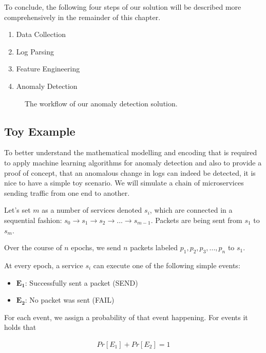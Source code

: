 To conclude, the following four steps of our solution will be described more comprehensively in the remainder of this chapter.

\begin{enumerate}
    \item Data Collection 
    \item Log Parsing
    \item Feature Engineering
    \item Anomaly Detection
\end{enumerate}

\begin{figure}[h]
    \centering
    
    \caption{The workflow of our anomaly detection solution.}
    \label{fig:worklowOverview}
\end{figure}


\subsection{Toy Example}
To better understand the mathematical modelling and encoding that is required to apply machine learning algorithms for anomaly detection and also to provide a proof of concept, that an anomalous change in logs can indeed be detected, it is nice to have a simple toy scenario. We will simulate a chain of microservices sending traffic from one end to another.

Let's set $m$ as a number of services denoted $s_i$, which are connected in a sequential fashion: $s_0 \rightarrow s_1 \rightarrow s_2 \rightarrow ... \rightarrow s_{m-1}$. Packets are being sent from $s_1$ to $s_m$.

Over the course of $n$ epochs, we send $n$ packets labeled $p_1, p_2, p_3, ..., p_n$ to $s_1$.

At every epoch, a service $s_i$ can execute one of the following simple events: 

\begin{itemize}
    \item $\mathbf{E_1}$: Successfully sent a packet (SEND)
    \item $\mathbf{E_2}$: No packet was sent (FAIL)
\end{itemize}

For each event, we assign a probability of that event happening. For events it holds that 

\begin{gather*}
    Pr[E_1] + Pr[E_2] = 1
\end{gather*}

